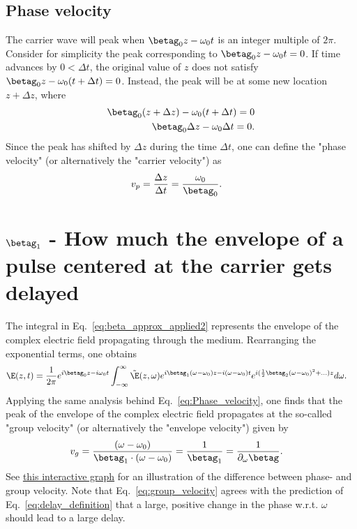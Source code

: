 \subsection{Phase velocity}
\label{sec:Phase_velocity}
The carrier wave will peak when $\betag_0z-\omega_0t$ is an integer multiple of $2\pi$. Consider for simplicity the peak corresponding to $\betag_0z-\omega_0t=0$. If time advances by $0<\Delta t$, the original value of $z$ does not satisfy $\betag_0z-\omega_0(t+\Delta t)=0$. Instead, the peak will be at some new location $z+\Delta z$, where
\begin{align}
    \betag_0(z+\Delta z)-\omega_0(t+\Delta t)=0\\ \nonumber
    \betag_0\Delta z-\omega_0\Delta t=0.
\end{align}
Since the peak has shifted by $\Delta z$ during the time $\Delta t$, one can define the "phase velocity" (or alternatively the "carrier velocity") as
\begin{align}
\label{eq:Phase_velocity}
    v_p &= \frac{\Delta z}{\Delta t} = \frac{\omega_0}{\betag_0}.
\end{align}


\section{$\betag_1$ - How much the envelope of a pulse centered at the carrier gets delayed}
The integral in Eq.~\ref{eq:beta_approx_applied2} represents the envelope of the complex electric field propagating through the medium. Rearranging the exponential terms, one obtains
\begin{align}
\label{eq:envelope_beta1}
    \E(z,t) &= \frac{1}{2\pi} e^{i\betag_0z-i\omega_0t}  \int_{-\infty}^{\infty} \Tilde{\E}(z,\omega) e^{i\betag_1(\omega-\omega_0)z-i(\omega-\omega_0) t} e^{i(\frac{1}{2}\betag_2(\omega-\omega_0)^2+...)z} d\omega.
\end{align}
Applying the same analysis behind Eq.~\ref{eq:Phase_velocity}, one finds that the peak of the envelope of the complex electric field propagates at the so-called "group velocity" (or alternatively the "envelope velocity") given by
\begin{align}
\label{eq:group_velocity}
    v_g &= \frac{(\omega-\omega_0)}{\betag_1\cdot(\omega-\omega_0)} = \frac{1}{\betag_1} = \frac{1}{\partial_\omega\betag}.
\end{align}
See \href{https://www.desmos.com/calculator/rq2physwac}{this interactive graph} for an illustration of the difference between phase- and group velocity. Note that Eq.~\ref{eq:group_velocity} agrees with the prediction of Eq.~\ref{eq:delay_definition} that a large, positive change in the phase w.r.t. $\omega$ should lead to a large delay.




